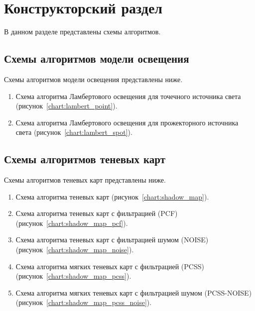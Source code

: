 \chapter{Конструкторский раздел}
\def \globalscale {1.0}

В данном разделе представлены схемы алгоритмов.

\section{Схемы алгоритмов модели освещения}

Схемы алгоритмов модели освещения представлены ниже.

\begin{enumerate}[label=\arabic*), labelsep=0.5em]
    \item Схема алгоритма Ламбертового освещения для точечного источника света (рисунок~\ref{chart:lambert_point}).
    \item Схема алгоритма Ламбертового освещения для прожекторного источника света (рисунок~\ref{chart:lambert_spot}).
\end{enumerate}


\FloatBarrier

\FloatBarrier

\section{Схемы алгоритмов теневых карт}

Схемы алгоритмов теневых карт представлены ниже.

\begin{enumerate}[label=\arabic*), labelsep=0.5em]
    \item Схема алгоритма теневых карт (\hbox{рисунок~\ref{chart:shadow_map}}).
    \item Схема алгоритма теневых карт с фильтрацией (PCF) (\hbox{рисунок~\ref{chart:shadow_map_pcf}}).
    \item Схема алгоритма теневых карт с фильтрацией шумом (NOISE) (\hbox{рисунок~\ref{chart:shadow_map_noise}}).
    \item Схема алгоритма мягких теневых карт с фильтрацией (PCSS) (\hbox{рисунок~\ref{chart:shadow_map_pcss}}).
    \item Схема алгоритма мягких теневых карт с фильтрацией шумом \hbox{(PCSS-NOISE)} (\hbox{рисунок~\ref{chart:shadow_map_pcss_noise}}).
\end{enumerate}

